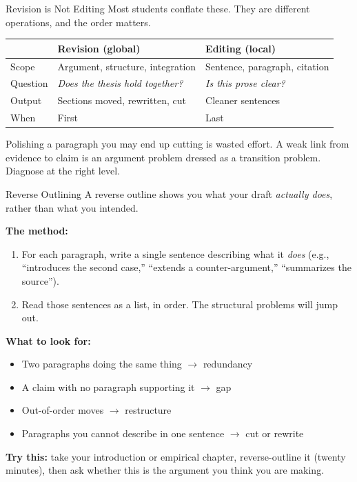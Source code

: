 \documentclass[aspectratio=169,11pt]{beamer}
\begin{document}
\begin{frame}{Revision is Not Editing}
    Most students conflate these. They are different operations, and the order matters.
    \vspace{0.15cm}
    \begin{table}
        \small
        \begin{tabular}{lll}
            \toprule
             & \textbf{Revision (global)} & \textbf{Editing (local)} \\
            \midrule
            Scope & Argument, structure, integration & Sentence, paragraph, citation \\
            \addlinespace
            Question & \textit{Does the thesis hold together?} & \textit{Is this prose clear?} \\
            \addlinespace
            Output & Sections moved, rewritten, cut & Cleaner sentences \\
            \addlinespace
            When & First & Last \\
            \bottomrule
        \end{tabular}
    \end{table}
    \vspace{0.3cm}
    Polishing a paragraph you may end up cutting is wasted effort. A weak link from evidence to claim is an argument problem dressed as a transition problem. Diagnose at the right level.
\end{frame}

\begin{frame}{Reverse Outlining}
    \footnotesize
    A reverse outline shows you what your draft \textit{actually does}, rather than what you intended.
    \vspace{0.1cm}

    \textbf{The method:}
    \begin{enumerate}
        \item For each paragraph, write a single sentence describing what it \textit{does} (e.g., ``introduces the second case,'' ``extends a counter-argument,'' ``summarizes the source'').
        \item Read those sentences as a list, in order. The structural problems will jump out.
    \end{enumerate}
    \vspace{0.05cm}
    \textbf{What to look for:}
    \begin{itemize}
        \item Two paragraphs doing the same thing $\rightarrow$ redundancy
        \item A claim with no paragraph supporting it $\rightarrow$ gap
        \item Out-of-order moves $\rightarrow$ restructure
        \item Paragraphs you cannot describe in one sentence $\rightarrow$ cut or rewrite
    \end{itemize}
    \vspace{0.15cm}
    \textbf{Try this:} take your introduction or empirical chapter, reverse-outline it (twenty minutes), then ask whether this is the argument you think you are making.
\end{frame}
\end{document}
